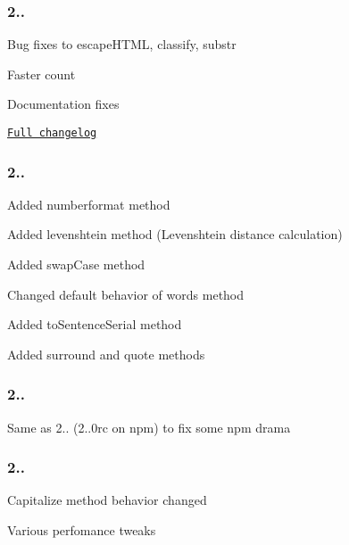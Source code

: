 \subsubsection*{2..}


\begin{DoxyItemize}
\item Bug fixes to {\ttfamily escape\+H\+T\+M\+L}, {\ttfamily classify}, {\ttfamily substr}
\item Faster {\ttfamily count}
\item Documentation fixes
\item \href{https://github.com/epeli/underscore.string/compare/v2.3.0...v2.3.1}{\tt Full changelog}
\end{DoxyItemize}

\subsubsection*{2..}


\begin{DoxyItemize}
\item Added {\ttfamily numberformat} method
\item Added {\ttfamily levenshtein} method (Levenshtein distance calculation)
\item Added {\ttfamily swap\+Case} method
\item Changed default behavior of {\ttfamily words} method
\item Added {\ttfamily to\+Sentence\+Serial} method
\item Added {\ttfamily surround} and {\ttfamily quote} methods
\end{DoxyItemize}

\subsubsection*{2..}


\begin{DoxyItemize}
\item Same as 2.. (2..\+0rc on npm) to fix some npm drama
\end{DoxyItemize}

\subsubsection*{2..}


\begin{DoxyItemize}
\item Capitalize method behavior changed
\item Various perfomance tweaks
\end{DoxyItemize}


